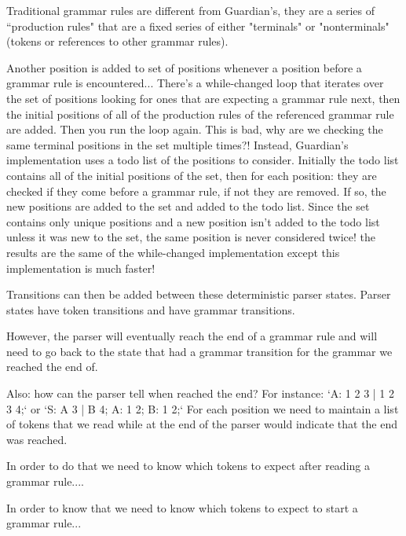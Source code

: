 {{		Traditional grammar rules are different from Guardian's, they are a series
		of ``production rules" that are a fixed series of either "terminals" or
		"nonterminals" (tokens or references to other grammar rules).
		
		Another position is added to set of positions whenever a position before
		a grammar rule is encountered...
		There's a while-changed loop that iterates over the set of positions
		looking for ones that are expecting a grammar rule next, then the initial
		positions of all of the production rules of the referenced grammar rule
		are added. Then you run the loop again.
		This is bad, why are we checking the same terminal positions in the set
		multiple times?! Instead, Guardian's implementation uses a todo list of
		the positions to consider. Initially the todo list contains all of the
		initial positions of the set, then for each position: they are checked
		if they come before a grammar rule, if not they are removed. If so,
		the new positions are added to the set and added to the todo list.
		Since the set contains only unique positions and a new position isn't
		added to the todo list unless it was new to the set, the same position
		is never considered twice! the results are the same of the while-changed
		implementation except this implementation is much faster!

		Transitions can then be added between these deterministic parser states.
		Parser states have token transitions and have grammar transitions.
		
		However, the parser will eventually reach the end of a grammar rule
		and will need to go back to the state that had a grammar transition for
		the grammar we reached the end of.
		
		Also: how can the parser tell when reached the end?
		For instance: `A: 1 2 3 | 1 2 3 4;` or `S: A 3 | B 4; A: 1 2; B: 1 2;`
		For each position we need to maintain a list of tokens that we read
		while at the end of the parser would indicate that the end was reached.
		
		In order to do that we need to know which tokens to expect after reading
		a grammar rule....
		
		In order to know that we need to know which tokens to expect to start
		a grammar rule...
		
}}
